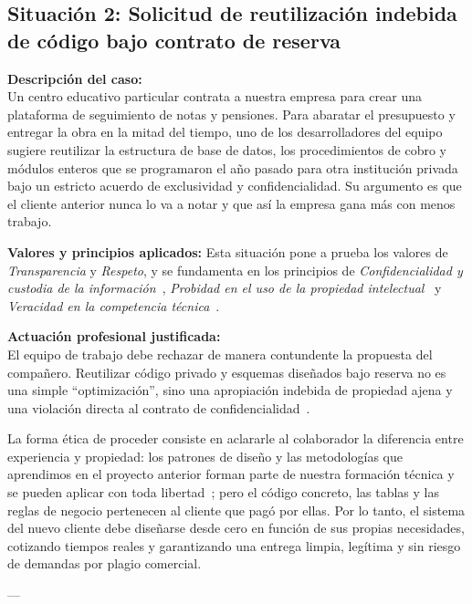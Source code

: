 \documentclass[12pt,a4paper,oneside]{article}
\begin{document}
\subsection{Situación 2: Solicitud de reutilización indebida de código bajo contrato de reserva}

\textbf{Descripción del caso:}\\
Un centro educativo particular contrata a nuestra empresa para crear una plataforma de seguimiento de notas y pensiones. Para abaratar el presupuesto y entregar la obra en la mitad del tiempo, uno de los desarrolladores del equipo sugiere reutilizar la estructura de base de datos, los procedimientos de cobro y módulos enteros que se programaron el año pasado para otra institución privada bajo un estricto acuerdo de exclusividad y confidencialidad. Su argumento es que el cliente anterior nunca lo va a notar y que así la empresa gana más con menos trabajo.

\textbf{Valores y principios aplicados:}
Esta situación pone a prueba los valores de \textit{Transparencia} y \textit{Respeto}, y se fundamenta en los principios de \textit{Confidencialidad y custodia de la información}~\cite{gotterbarn2001}, \textit{Probidad en el uso de la propiedad intelectual}~\cite{acm2018} y \textit{Veracidad en la competencia técnica}~\cite{ieee2020,sommerville2011}.

\textbf{Actuación profesional justificada:}\\
El equipo de trabajo debe rechazar de manera contundente la propuesta del compañero. Reutilizar código privado y esquemas diseñados bajo reserva no es una simple ``optimización'', sino una apropiación indebida de propiedad ajena y una violación directa al contrato de confidencialidad~\cite{acm2018,gotterbarn2001}.

La forma ética de proceder consiste en aclararle al colaborador la diferencia entre experiencia y propiedad: los patrones de diseño y las metodologías que aprendimos en el proyecto anterior forman parte de nuestra formación técnica y se pueden aplicar con toda libertad~\cite{sommerville2011}; pero el código concreto, las tablas y las reglas de negocio pertenecen al cliente que pagó por ellas. Por lo tanto, el sistema del nuevo cliente debe diseñarse desde cero en función de sus propias necesidades, cotizando tiempos reales y garantizando una entrega limpia, legítima y sin riesgo de demandas por plagio comercial.

---
\end{document}
